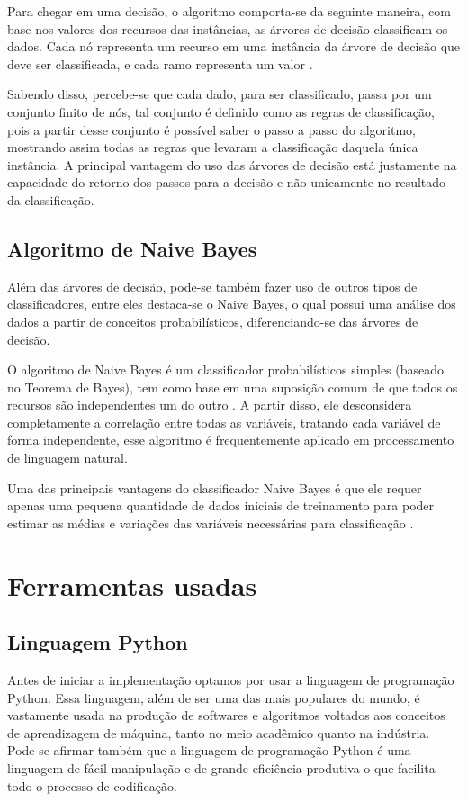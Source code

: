 \documentclass[preprint,12pt,times]{elsarticle}
\begin{document}
	Para chegar em uma decisão, o algoritmo comporta-se da seguinte maneira, com base nos valores dos recursos das instâncias, as árvores de decisão classificam os dados. Cada nó representa um recurso em uma instância da árvore de decisão que deve ser classificada, e cada ramo representa um valor \cite{Pandya:2015}.

	Sabendo disso, percebe-se que cada dado, para ser classificado, passa por um conjunto finito de nós, tal conjunto é definido como as regras de classificação, pois a partir desse conjunto é possível saber o passo a passo do algoritmo, mostrando assim todas as regras que levaram a classificação daquela única instância. A principal vantagem do uso das árvores de decisão está justamente na capacidade do retorno dos passos para a decisão e não unicamente no resultado da classificação.

	\subsection{Algoritmo de Naive Bayes}

	Além das árvores de decisão, pode-se também fazer uso de outros tipos de classificadores, entre eles destaca-se o Naive Bayes, o qual possui uma análise dos dados a partir de conceitos probabilísticos, diferenciando-se das árvores de decisão.
	
	O algoritmo de Naive Bayes é um classificador probabilísticos simples (baseado no Teorema de Bayes), tem como base em uma suposição comum de que todos os recursos são independentes um do outro \cite{xu:2018}. A partir disso, ele desconsidera completamente a correlação entre todas as variáveis, tratando cada variável de forma independente, esse algoritmo  é frequentemente aplicado em processamento de linguagem natural.
	
	Uma das principais vantagens do classificador Naive Bayes é que ele requer apenas uma pequena quantidade de dados iniciais de treinamento para poder estimar as médias e variações das variáveis necessárias para classificação \cite{vijayarani:2015}.
	
	\section{Ferramentas usadas}
	\label{Ferramentas usadas}
	
	\subsection{Linguagem Python}
	Antes de iniciar a implementação optamos por usar a linguagem de programação Python. Essa linguagem, além de ser uma das mais populares do mundo, é vastamente usada na produção de softwares e algoritmos voltados aos conceitos de aprendizagem de máquina, tanto no meio acadêmico quanto na indústria. Pode-se afirmar também que a linguagem de programação Python é uma linguagem de fácil manipulação e de grande eficiência produtiva o que facilita todo o processo de codificação.
	
\end{document}
